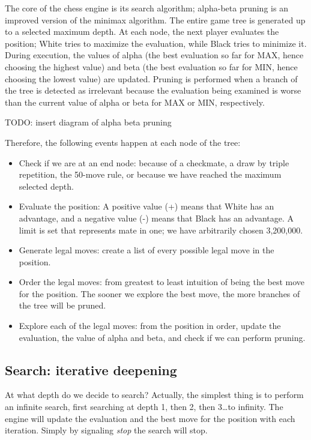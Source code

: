 The core of the chess engine is its search algorithm; alpha-beta pruning is an improved version of the minimax algorithm. The entire game tree is generated up to a selected maximum depth. At each node, the next player evaluates the position; White tries to maximize the evaluation, while Black tries to minimize it. During execution, the values of alpha (the best evaluation so far for MAX, hence choosing the highest value) and beta (the best evaluation so far for MIN, hence choosing the lowest value) are updated. Pruning is performed when a branch of the tree is detected as irrelevant because the evaluation being examined is worse than the current value of alpha or beta for MAX or MIN, respectively.

\vspace{1em}

TODO: insert diagram of alpha beta pruning

\vspace{1em}

Therefore, the following events happen at each node of the tree:

\begin{itemize}
    \item Check if we are at an end node: because of a checkmate, a draw by triple repetition, the 50-move rule, or because we have reached the maximum selected depth.
    \item Evaluate the position: A positive value (+) means that White has an advantage, and a negative value (-) means that Black has an advantage. A limit is set that represents mate in one; we have arbitrarily chosen 3,200,000.
    \item Generate legal moves: create a list of every possible legal move in the position.
    \item Order the legal moves: from greatest to least intuition of being the best move for the position. The sooner we explore the best move, the more branches of the tree will be pruned.
    \item Explore each of the legal moves: from the position in order, update the evaluation, the value of alpha and beta, and check if we can perform pruning.
\end{itemize}

\subsection{Search: iterative deepening}

At what depth do we decide to search? Actually, the simplest thing is to perform an infinite search, first searching at depth 1, then 2, then 3\ldots to infinity. The engine will update the evaluation and the best move for the position with each iteration. Simply by signaling \textit{stop} the search will stop.


